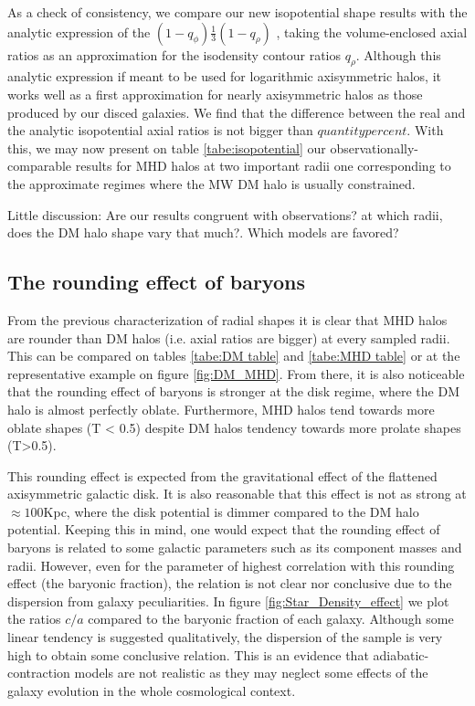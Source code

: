\documentclass[a4paper,fleqn,usenatbib]{mnras}
\begin{document}
As a check of consistency, we compare our new isopotential shape
results with the analytic expression of the
$(1-q_{\phi})\frac{1}{3}(1-q_{\rho})$ \citep[Binney and Tremaine
  year]{Binney and tremaine}, taking the volume-enclosed axial ratios
as an approximation for the isodensity contour ratios
$q_{\rho}$. Although this analytic expression if meant to be used for
logarithmic axisymmetric halos, it works well as a first approximation
for nearly axisymmetric halos as those produced by our disced
galaxies. We find that the difference between the real and the
analytic isopotential axial ratios is not bigger than $quantity
percent$. With this, we may now present on table
\ref{tabe:isopotential} our observationally-comparable results for MHD
halos at two important radii one corresponding to the approximate
regimes where the MW DM halo is usually constrained. 

Little discussion: Are our results congruent with observations? at
which radii, does the DM halo shape vary that much?. Which models are
favored? 


\subsection{The rounding effect of baryons}

From the previous characterization of radial shapes it is clear that
MHD halos are rounder than DM halos (i.e. axial ratios are bigger) at
every sampled radii. This can be compared on tables \ref{tabe:DM
  table} and \ref{tabe:MHD table} or at the representative example on
figure \ref{fig:DM_MHD}. From there, it is also noticeable that the
rounding effect of baryons is stronger at the disk regime, where the
DM halo is almost perfectly oblate. Furthermore, MHD halos tend
towards more oblate shapes (T < 0.5) despite DM halos tendency towards
more prolate shapes (T>0.5). 

This rounding effect is expected from the gravitational effect of the
flattened axisymmetric galactic disk. It is also reasonable that this
effect is not as strong at $\approx 100$Kpc, where the disk potential
is dimmer compared to the DM halo potential. Keeping this in mind, one
would expect that the rounding effect of baryons is related to some
galactic parameters such as its component masses and radii. However,
even for the parameter of highest correlation with this rounding
effect (the baryonic fraction), the relation is not clear nor
conclusive due to the dispersion from galaxy peculiarities. In figure
\ref{fig:Star_Density_effect} we plot the ratios $c/a$ compared to the
baryonic fraction of each galaxy. Although some linear tendency is
suggested qualitatively, the dispersion of the sample is very high to
obtain some conclusive relation. This is an evidence that
adiabatic-contraction models are not realistic as they may neglect
some effects of the galaxy evolution in the whole cosmological
context.  
\end{document}
